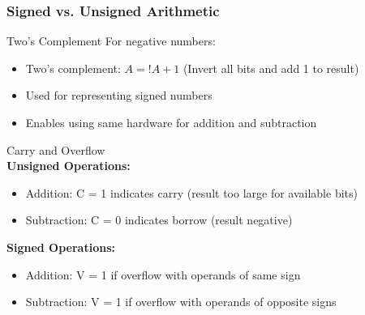 \subsubsection{Signed vs. Unsigned Arithmetic}

\begin{definition}{Two's Complement}
For negative numbers:
\begin{itemize}
  \item Two's complement: $A = !A + 1$ (Invert all bits and add 1 to result)
  \item Used for representing signed numbers
  \item Enables using same hardware for addition and subtraction
\end{itemize}
\end{definition}

\begin{concept}{Carry and Overflow}\\
\textbf{Unsigned Operations:}
\begin{itemize}
  \item Addition: C = 1 indicates carry (result too large for available bits)
  \item Subtraction: C = 0 indicates borrow (result negative)
\end{itemize}

\textbf{Signed Operations:}
\begin{itemize}
  \item Addition: V = 1 if overflow with operands of same sign
  \item Subtraction: V = 1 if overflow with operands of opposite signs
\end{itemize}
\end{concept}

